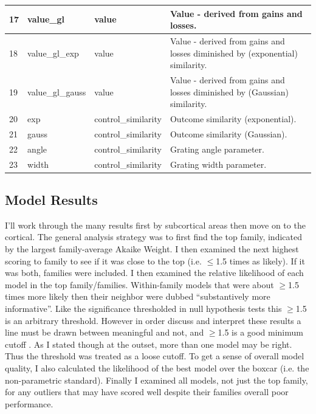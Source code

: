 \documentclass[doc,12pt]{apa}        %
\begin{document}
\begin{center}
\begin{longtable}{ | l | l | l | p{6cm} |}
        17 & value\_gl & value & Value - derived from gains and losses. \\ \hline
        18 & value\_gl\_exp & value & Value - derived from gains and losses diminished by (exponential) similarity. \\ \hline
        19 & value\_gl\_gauss & value & Value - derived from gains and losses diminished by (Gaussian) similarity. \\ \hline 
        20 & exp & control\_similarity & Outcome similarity (exponential). \\ \hline
        21 & gauss & control\_similarity & Outcome similarity (Gaussian). \\ \hline
        22 & angle & control\_similarity & Grating angle parameter. \\ \hline
        23 &width & control\_similarity & Grating width parameter. \\ \hline
    \end{longtable}
\end{center}


\subsection{Model Results}
\label{sub:modelresults}
I'll work through the many results first by subcortical areas then move on to the cortical.  The general analysis strategy was to first find the top family, indicated by the largest family-average Akaike Weight.  I then examined the next highest scoring to family to see if it was close to the top (i.e. $\le$1.5 times as likely).  If it was both, families were included.  I then examined the relative likelihood of each model in the top family/families.  Within-family models that were about $\ge$1.5 times more likely then their neighbor were dubbed ``substantively more informative''.  Like the significance thresholded in null hypothesis tests this $\ge$1.5 is an arbitrary threshold.  However in order discuss and interpret these results a line must be drawn between meaningful and not, and $\ge$1.5 is a good minimum cutoff \cite{Anderson:2000p9475, Forster:2000p9623}.  As I stated though at the outset, more than one model may be right.  Thus the threshold was treated as a loose cutoff.  To get a sense of overall model quality, I also calculated the likelihood of the best model over the boxcar (i.e. the non-parametric standard).  Finally I examined all models, not just the top family, for any outliers that may have scored well despite their families overall poor performance.
\end{document}
